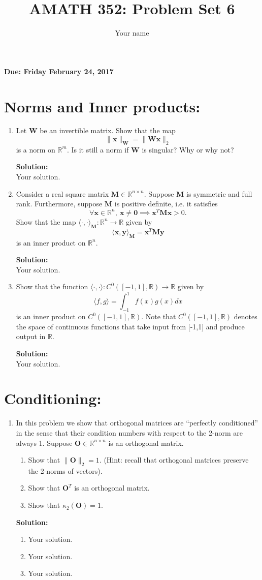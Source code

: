 \documentclass[]{article}
\title{AMATH 352: Problem Set 6}
\author{Your name}
\newcommand{\R}{\mathbb{R}}				%
\newcommand{\x}{\bm{x}}					%
\newcommand{\y}{\bm{y}}					%
\newcommand{\la}{\langle}				%
\newcommand{\ra}{\rangle}				%
\newcommand{\solution}{\vskip 0.5cm \textbf{\large Solution:} \\}
\begin{document}
\maketitle
{\Large \textbf{Due: Friday February 24, 2017}} \\

\section*{Norms and Inner products:}
\begin{enumerate}[resume]
	\item Let $\bm{W}$ be an invertible matrix. Show that the map
	\[
		\|\x\|_{\bm{W}}=\|\bm{Wx}\|_2
	\]
	is a norm on $\R^m$. Is it still a norm if $\bm{W}$ is singular? Why or why not?

	\solution Your solution.


	\item Consider a real square matrix $\bm{M}\in\R^{n\times n}$. Suppose $\bm{M}$ is symmetric and full rank. Furthermore, suppose $\bm{M}$ is positive definite, i.e. it satisfies
	\[
		\forall\x\in\R^n,~\x\neq\bm{0}\implies \x^T\bm{Mx}>0.
	\]
	Show that the map $\la\cdot,\cdot\ra_{\bm{M}}:\R^n\to\R$ given by
	\[
		\la \x,\y\ra_{\bm{M}} =\x^T\bm{My}
	\]
	is an inner product on $\R^n$.

	\solution Your solution.

	\item Show that the function $\la\cdot,\cdot\ra:C^0([-1,1],\R)\to\R$ given by 
	\[
		\la f,g\ra = \int^1_{-1}f(x)g(x)dx
	\]
	is an inner product on $C^0([-1,1],\R)$. Note that $C^0([-1,1],\R)$ denotes the space of continuous functions that take input from [-1,1] and produce output in $\R$.

	\solution Your solution.

\end{enumerate}

\section*{Conditioning:}
\begin{enumerate}[resume]
	\item In this problem we show that orthogonal matrices are ``perfectly conditioned'' in the sense that their condition numbers with respect to the 2-norm are always 1. Suppose $\bm{O}\in\R^{n\times n}$ is an orthogonal matrix.
	\begin{enumerate}
		\item Show that $\|\bm{O}\|_2=1$. (Hint: recall that orthogonal matrices preserve the 2-norms of vectors).
		\item Show that $\bm{O}^T$ is an orthogonal matrix.
		\item Show that $\kappa_2(\bm{O})=1$.
	\end{enumerate}

	\solution
	\begin{enumerate}
		\item Your solution.
		\item Your solution.
		\item Your solution.
	\end{enumerate}
\end{enumerate}
\end{document}
